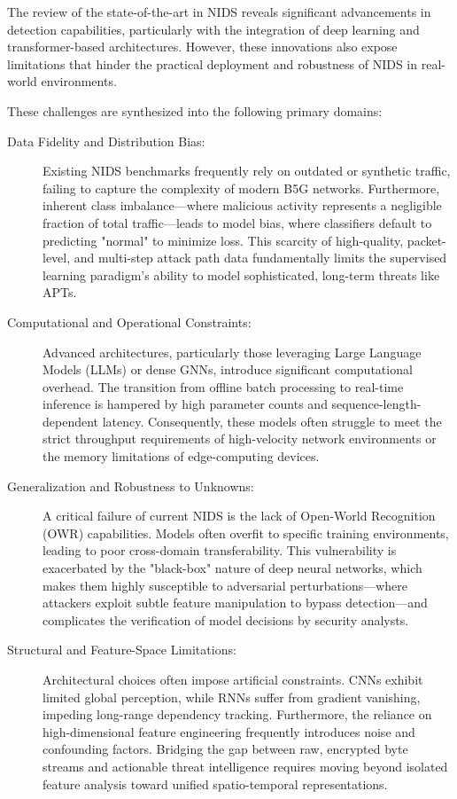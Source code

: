 \documentclass[12pt, a4paper]{report}
\begin{document}

The review of the state-of-the-art in NIDS reveals significant advancements
 in detection capabilities, particularly with the integration of deep learning and 
 transformer-based architectures.     However, these innovations also expose 
  limitations that hinder the practical deployment and robustness of NIDS in real-world 
  environments.


 These challenges are synthesized into the following primary domains:

\begin{description}
    \item[Data Fidelity and Distribution Bias:] Existing NIDS benchmarks frequently rely on outdated or synthetic traffic, failing to capture the complexity of modern B5G networks. Furthermore, inherent class imbalance—where malicious activity represents a negligible fraction of total traffic—leads to model bias, where classifiers default to predicting "normal" to minimize loss. This scarcity of high-quality, packet-level, and multi-step attack path data fundamentally limits the supervised learning paradigm's ability to model sophisticated, long-term threats like APTs.

    \item[Computational and Operational Constraints:] Advanced architectures, particularly those leveraging Large Language Models (LLMs) or dense GNNs, introduce significant computational overhead. The transition from offline batch processing to real-time inference is hampered by high parameter counts and sequence-length-dependent latency. Consequently, these models often struggle to meet the strict throughput requirements of high-velocity network environments or the memory limitations of edge-computing devices.

    \item[Generalization and Robustness to Unknowns:] A critical failure of current NIDS is the lack of Open-World Recognition (OWR) capabilities. Models often overfit to specific training environments, leading to poor cross-domain transferability. This vulnerability is exacerbated by the "black-box" nature of deep neural networks, which makes them highly susceptible to adversarial perturbations—where attackers exploit subtle feature manipulation to bypass detection—and complicates the verification of model decisions by security analysts.

    \item[Structural and Feature-Space Limitations:] Architectural choices often impose artificial constraints. CNNs exhibit limited global perception, while RNNs suffer from gradient vanishing, impeding long-range dependency tracking. Furthermore, the reliance on high-dimensional feature engineering frequently introduces noise and confounding factors. Bridging the gap between raw, encrypted byte streams and actionable threat intelligence requires moving beyond isolated feature analysis toward unified spatio-temporal representations.
\end{description}
\end{document}
